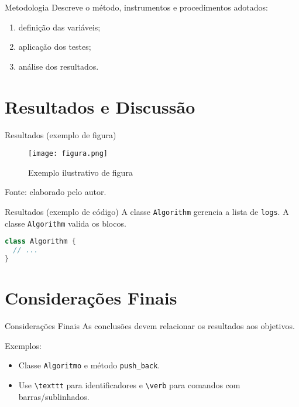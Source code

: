 \documentclass[aspectratio=169]{beamer}
\newcommand{\code}[1]{\texttt{#1}}
\begin{document}
\begin{frame}{Metodologia}
Descreve o método, instrumentos e procedimentos adotados:

\begin{enumerate}[label=\alph*), itemsep=2pt]
  \item definição das variáveis;
  \item aplicação dos testes;
  \item análise dos resultados.
\end{enumerate}
\end{frame}

\section{Resultados e Discussão}

\begin{frame}{Resultados (exemplo de figura)}
\begin{figure}
  \texttt{[image: figura.png]}
  \caption{Exemplo ilustrativo de figura}
\end{figure}
{\tiny Fonte: elaborado pelo autor.}
\end{frame}

\begin{frame}[fragile]{Resultados (exemplo de código)}
A classe \code{Algorithm} gerencia a lista de \code{logs}.  
A classe \lstinline!Algorithm! valida os blocos.
\begin{lstlisting}[language=Java, caption={Exemplo de classe}, label={lst:ex}]
class Algorithm {
  // ...
}
\end{lstlisting}
\end{frame}

\section{Considerações Finais}

\begin{frame}[fragile]{Considerações Finais}
As conclusões devem relacionar os resultados aos objetivos.

Exemplos:
\begin{itemize}
  \item Classe \texttt{Algoritmo} e método \verb|push_back|.
  \item Use \verb|\texttt| para identificadores e \verb|\verb| para comandos com barras/sublinhados.
\end{itemize}
\end{frame}
\end{document}
